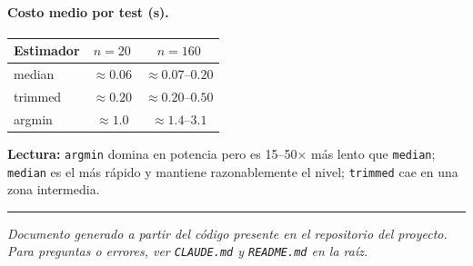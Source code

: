 \documentclass[11pt,a4paper]{article}
\begin{document}
\paragraph{Costo medio por test (s).}
\begin{center}
\small
\begin{tabular}{@{}lcc@{}}
\toprule
Estimador & $n=20$ & $n=160$ \\
\midrule
median  & $\approx 0.06$ & $\approx 0.07$--$0.20$ \\
trimmed & $\approx 0.20$ & $\approx 0.20$--$0.50$ \\
argmin  & $\approx 1.0$  & $\approx 1.4$--$3.1$ \\
\bottomrule
\end{tabular}
\end{center}

\textbf{Lectura:} \texttt{argmin} domina en potencia pero es 15--50$\times$ más lento que \texttt{median}; \texttt{median} es el más rápido y mantiene razonablemente el nivel; \texttt{trimmed} cae en una zona intermedia.

\vspace{1em}
\hrule
\vspace{0.5em}
\begin{center}\small\itshape
Documento generado a partir del código presente en el repositorio del proyecto.\\
Para preguntas o errores, ver \texttt{CLAUDE.md} y \texttt{README.md} en la raíz.
\end{center}
\end{document}
